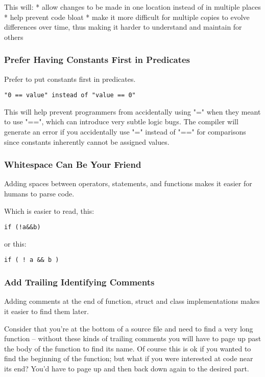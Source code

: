 This will:
  * allow changes to be made in one location instead of in multiple places
  * help prevent code bloat
  * make it more difficult for multiple copies to evolve differences over time,
    thus making it harder to understand and maintain for others

\hypertarget{toc24}{}
\subsubsection{Prefer Having Constants First in Predicates}
Prefer to put constants first in predicates. 

\begin{verbatim}
"0 == value" instead of "value == 0"
\end{verbatim}

This will help prevent programmers from accidentally using "=" when they meant
to use "==", which can introduce very subtle logic bugs.  The compiler will
generate an error if you accidentally use "=" instead of "==" for comparisons
since constants inherently cannot be assigned values.

\hypertarget{toc25}{}
\subsubsection{Whitespace Can Be Your Friend}
Adding spaces between operators, statements, and functions makes it easier for
humans to parse code.

Which is easier to read, this:

\begin{verbatim}
if (!a&&b)
\end{verbatim}

or this:

\begin{verbatim}
if ( ! a && b )
\end{verbatim}

\hypertarget{toc26}{}
\subsubsection{Add Trailing Identifying Comments}
Adding comments at the end of function, struct and class implementations makes
it easier to find them later.

Consider that you're at the bottom of a source file and need to find a very
long function -- without these kinds of trailing comments you will have to page
up past the body of the function to find its name.  Of course this is ok if you
wanted to find the beginning of the function; but what if you were interested
at code near its end?  You'd have to page up and then back down again to the
desired part.


